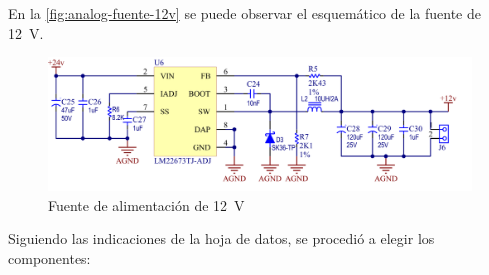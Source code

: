 \documentclass[titlepage, 12pt]{article}
\begin{document}
En la \autoref{fig:analog-fuente-12v} se puede observar el esquemático de la fuente de \SI{12}{V}.

  \begin{figure}[!htbp]
    \centering
    \includegraphics[scale=0.55]{images/analog-fuente-12v}
    \caption{Fuente de alimentación de \SI{12}{V}}
    \label{fig:analog-fuente-12v}
  \end{figure}

Siguiendo las indicaciones de la hoja de datos, se procedió a elegir los componentes:
\end{document}
